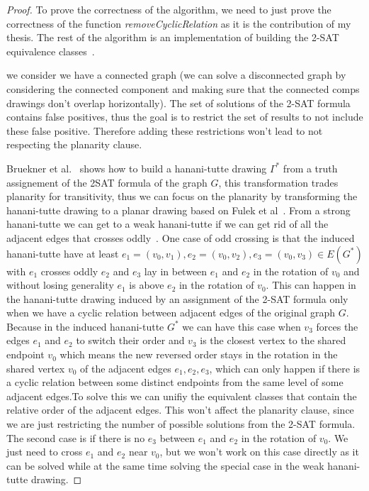 \documentclass[a4paper]{article}
\begin{document}
\begin{proof}
    To prove the correctness of the algorithm, we need to just prove the correctness of the function \textit{removeCyclicRelation} as 
    it is the contribution of my thesis. The rest of the algorithm is an implementation of building the 2-SAT equivalence classes~\cite{randerath2001satisfiability}. 

    we consider we have a connected graph (we can solve a disconnected graph by considering the connected component and making 
    sure that the connected comps drawings don't overlap horizontally). The set of solutions of the 2-SAT formula contains false positives, thus the goal is to restrict the 
    set of results to not include these false positive. Therefore adding these restrictions won't lead to not respecting the planarity clause.  

    Bruekner et al.~\cite{bruckner2022level} shows how to build a hanani-tutte drawing $\Gamma^*$ from a truth assignement of the 2SAT formula of the graph $G$, this transformation trades planarity for transitivity, thus we can focus on the planarity by 
    transforming the hanani-tutte drawing to a planar drawing based on Fulek et al~\cite{fulek2013hanani}. From a strong hanani-tutte we can get to a weak hanani-tutte if we can get rid of all the 
    adjacent edges that crosses oddly~\cite{fulek2013hanani}. One case of odd crossing is that the induced hanani-tutte have at least  $e_1 =\left( v_0,v_1 \right) , e_2 = \left( v_0, v_2 \right) , e_3 = \left( v_0, v_3 \right) \in E\left( G^* \right)$ 
    with $e_1$ crosses oddly $e_2$ and $e_3$ lay in between $e_1$ and $e_2$ in the rotation of $v_0$ and without losing generality $e_1$ is above $e_2$ in the rotation of $v_0$. This can happen in the hanani-tutte drawing induced by an assignment of the 2-SAT formula only when we have a cyclic relation 
    between adjacent edges of the original graph $G$. Because in the induced hanani-tutte $G^*$ we can have this case when $v_3$ forces the edges $e_1$ and $e_2$ to switch their order and $v_3$ is the closest vertex 
    to the shared endpoint $v_0$ which means the new reversed order stays in the rotation in the shared vertex $v_0$ of the adjacent edges $e_1,e_2,e_3$, which can only happen if there is a cyclic relation between some distinct endpoints from the same level of some adjacent edges.To solve this we can unifiy the equivalent classes that contain the relative order of the adjacent edges. This won't affect the planarity clause, 
    since we are just restricting the number of possible solutions from the 2-SAT formula. The second case is if there is no $e_3$ between $e_1$ and $e_2$ in the rotation of $v_0$. We just need to cross $e_1$ and $e_2$ near $v_0$, but we won't 
    work on this case directly as it can be solved while at the same time solving the special case in the weak hanani-tutte drawing. 
    

\end{proof}
\end{document}
